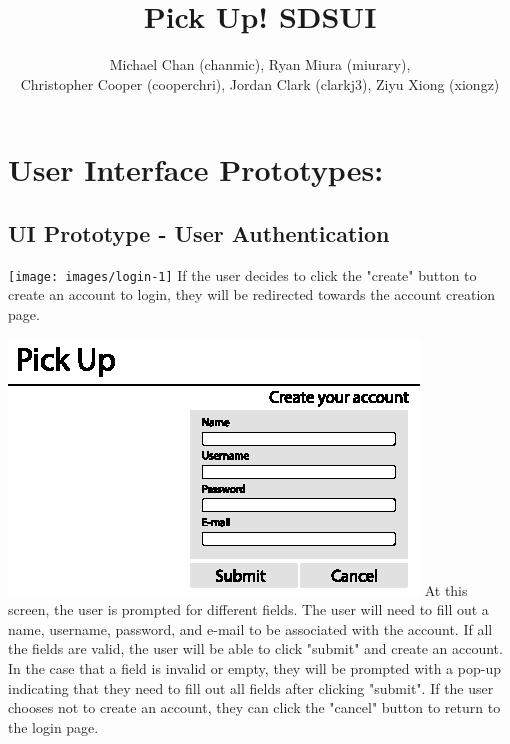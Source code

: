 \documentclass[a4paper]{article}
\title{Pick Up! SDSUI}
\author{Michael Chan (chanmic), Ryan Miura (miurary), \\Christopher Cooper (cooperchri), Jordan Clark (clarkj3), Ziyu Xiong (xiongz)}
\begin{document}
\maketitle

\section{User Interface Prototypes:}

\subsection{UI Prototype - User Authentication}
\texttt{[image: images/login-1]}
If the user decides to click the "create" button to create an account to login, they will be redirected towards the account creation page.

\includegraphics[width=\textwidth]{images/signup1.eps}
At this screen, the user is prompted for different fields. The user will need to fill out a name, username, password, and e-mail to be associated with the account. If all the fields are valid, the user will be able to click "submit" and create an account. In the case that a field is invalid or empty, they will be prompted with a pop-up indicating that they need to fill out all fields after clicking "submit". If the user chooses not to create an account, they can click the "cancel" button to return to the login page.
\end{document}
